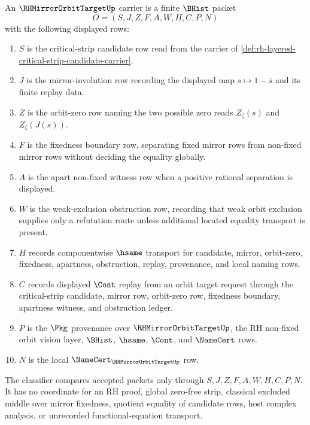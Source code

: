 \begin{definition}
\label{def:rh-mirror-orbit-target-carrier}
An $\RHMirrorOrbitTargetUp$ carrier is a finite $\BHist$ packet
$$
O=(S,J,Z,F,A,W,H,C,P,N)
$$
with the following displayed rows:
\begin{enumerate}
\item $S$ is the critical-strip candidate row read from the carrier of \autoref{def:rh-layered-critical-strip-candidate-carrier}.
\item $J$ is the mirror-involution row recording the displayed map $s\mapsto 1-\overline{s}$ and its finite replay data.
\item $Z$ is the orbit-zero row naming the two possible zero reads $Z_{\zeta}(s)$ and $Z_{\zeta}(J(s))$.
\item $F$ is the fixedness boundary row, separating fixed mirror rows from non-fixed mirror rows without deciding the equality globally.
\item $A$ is the apart non-fixed witness row when a positive rational separation is displayed.
\item $W$ is the weak-exclusion obstruction row, recording that weak orbit exclusion supplies only a refutation route unless additional located equality transport is present.
\item $H$ records componentwise $\hsame$ transport for candidate, mirror, orbit-zero, fixedness, apartness, obstruction, replay, provenance, and local naming rows.
\item $C$ records displayed $\Cont$ replay from an orbit target request through the critical-strip candidate, mirror row, orbit-zero row, fixedness boundary, apartness witness, and obstruction ledger.
\item $P$ is the $\Pkg$ provenance over $\RHMirrorOrbitTargetUp$, the RH non-fixed orbit vision layer, $\BHist$, $\hsame$, $\Cont$, and $\NameCert$ rows.
\item $N$ is the local $\NameCert_{\RHMirrorOrbitTargetUp}$ row.
\end{enumerate}
The classifier compares accepted packets only through $S,J,Z,F,A,W,H,C,P,N$. It has no coordinate for an RH proof, global zero-free strip, classical excluded middle over mirror fixedness, quotient equality of candidate rows, host complex analysis, or unrecorded functional-equation transport.
\end{definition}

